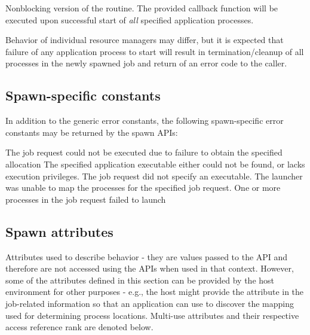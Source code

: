 \optattrend

\descr

Nonblocking version of the  routine. The provided callback function will be executed upon successful start of \textit{all} specified application processes.

\adviceuserstart
Behavior of individual resource managers may differ, but it is expected that failure of any application process to start will result in termination/cleanup of all processes in the newly spawned job and return of an error code to the caller.
\adviceuserend

\subsection{Spawn-specific constants}
\label{api:struct:constants:spawn}

In addition to the generic error constants, the following spawn-specific error constants may be returned by the spawn \acp{API}:

\begin{constantdesc}
%
The job request could not be executed due to failure to obtain the specified allocation
%
The specified application executable either could not be found, or lacks execution privileges.
%
The job request did not specify an executable.
%
The launcher was unable to map the processes for the specified job request.
%
One or more processes in the job request failed to launch
%
\end{constantdesc}

\subsection{Spawn attributes}
\label{api:struct:attributes:spawn}

Attributes used to describe  behavior - they are values passed to the  \ac{API} and therefore are not accessed using the  \acp{API} when used in that context. However, some of the attributes defined in this section can be provided by the host environment for other purposes - e.g., the host might provide the  attribute in the job-related information so that an application can use  to discover the mapping used for determining process locations. Multi-use attributes and their respective access reference rank are denoted below.

